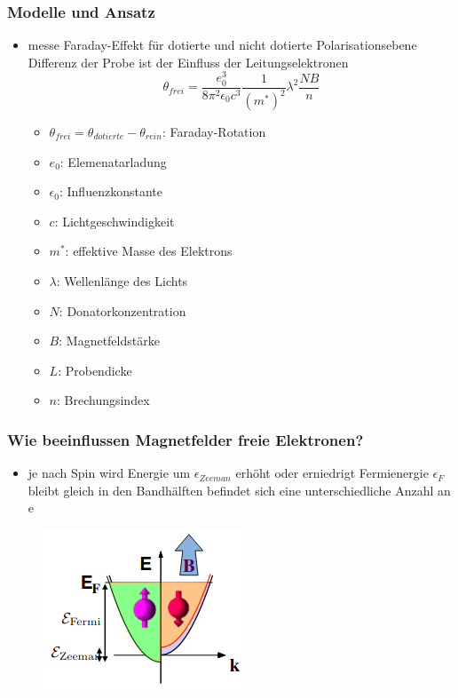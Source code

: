 \subsubsection*{Modelle und Ansatz}
\begin{itemize}
    \item messe Faraday-Effekt für dotierte und nicht dotierte Polarisationsebene
        \to Differenz der Probe ist der Einfluss der Leitungselektronen
        \begin{equation*}
            \theta_{frei}=\frac{e_0^3}{8\pi^2\epsilon_0c^3}\frac{1}{(m^*)^2}\lambda^2\frac{NB}{n}
        \end{equation*}
        \begin{itemize}
            \item $\theta_{frei}=\theta_{dotierte}-\theta_{rein}$: Faraday-Rotation
            \item $e_0$: Elemenatarladung
            \item $\epsilon_0$: Influenzkonstante
            \item $c$: Lichtgeschwindigkeit
            \item $m^*$: effektive Masse des Elektrons 
            \item $\lambda$: Wellenlänge des Lichts 
            \item $N$: Donatorkonzentration
            \item $B$: Magnetfeldstärke
            \item $L$: Probendicke
            \item $n$: Brechungsindex
        \end{itemize}
\end{itemize}

\subsubsection*{Wie beeinflussen Magnetfelder freie Elektronen?}
\begin{itemize}
    \item je nach Spin wird Energie um $\epsilon_{Zeeman}$ erhöht oder erniedrigt
        \to Fermienergie $\epsilon_F$ bleibt gleich
        \iff in den Bandhälften befindet sich eine unterschiedliche Anzahl an e 
\end{itemize}
\begin{figure}[H]
    \centering
    \includegraphics[scale=0.8]{pictures/magnetfeld_freieElektronen.png}
\end{figure}

